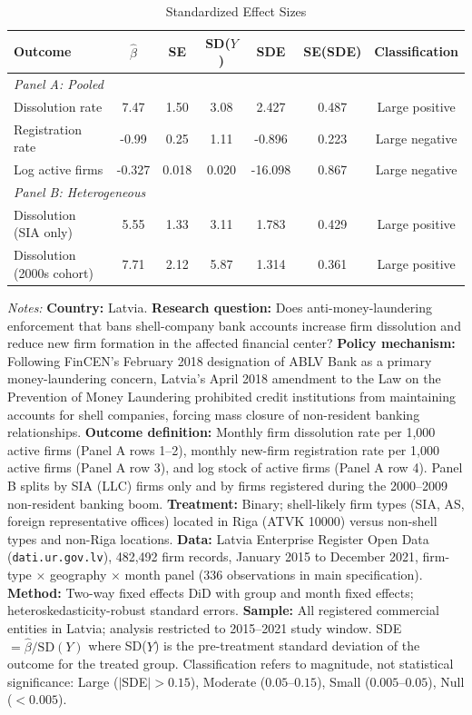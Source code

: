 \begin{table}[t]
\centering
\caption{Standardized Effect Sizes}
\label{tab:sde}
\begin{tabular}{lcccccc}
\hline\hline
Outcome & $\hat{\beta}$ & SE & SD($Y$) & SDE & SE(SDE) & Classification \\
\hline
\multicolumn{7}{l}{\textit{Panel A: Pooled}} \\
Dissolution rate & 7.47 & 1.50 & 3.08 & 2.427 & 0.487 & Large positive \\
Registration rate & -0.99 & 0.25 & 1.11 & -0.896 & 0.223 & Large negative \\
Log active firms & -0.327 & 0.018 & 0.020 & -16.098 & 0.867 & Large negative \\
[6pt]
\multicolumn{7}{l}{\textit{Panel B: Heterogeneous}} \\
Dissolution (SIA only) & 5.55 & 1.33 & 3.11 & 1.783 & 0.429 & Large positive \\
Dissolution (2000s cohort) & 7.71 & 2.12 & 5.87 & 1.314 & 0.361 & Large positive \\
\hline\hline
\end{tabular}
\begin{tablenotes}[flushleft]
\small
\item \textit{Notes:} \textbf{Country:} Latvia. \textbf{Research question:} Does anti-money-laundering enforcement that bans shell-company bank accounts increase firm dissolution and reduce new firm formation in the affected financial center? \textbf{Policy mechanism:} Following FinCEN's February 2018 designation of ABLV Bank as a primary money-laundering concern, Latvia's April 2018 amendment to the Law on the Prevention of Money Laundering prohibited credit institutions from maintaining accounts for shell companies, forcing mass closure of non-resident banking relationships. \textbf{Outcome definition:} Monthly firm dissolution rate per 1,000 active firms (Panel A rows 1--2), monthly new-firm registration rate per 1,000 active firms (Panel A row 3), and log stock of active firms (Panel A row 4). Panel B splits by SIA (LLC) firms only and by firms registered during the 2000--2009 non-resident banking boom. \textbf{Treatment:} Binary; shell-likely firm types (SIA, AS, foreign representative offices) located in Riga (ATVK 10000) versus non-shell types and non-Riga locations. \textbf{Data:} Latvia Enterprise Register Open Data (\texttt{dati.ur.gov.lv}), 482,492 firm records, January 2015 to December 2021, firm-type $\times$ geography $\times$ month panel (336 observations in main specification). \textbf{Method:} Two-way fixed effects DiD with group and month fixed effects; heteroskedasticity-robust standard errors. \textbf{Sample:} All registered commercial entities in Latvia; analysis restricted to 2015--2021 study window. SDE $= \hat{\beta} / \text{SD}(Y)$ where SD($Y$) is the pre-treatment standard deviation of the outcome for the treated group. Classification refers to magnitude, not statistical significance: Large ($|$SDE$| > 0.15$), Moderate ($0.05$--$0.15$), Small ($0.005$--$0.05$), Null ($< 0.005$).
\end{tablenotes}
\end{table}

